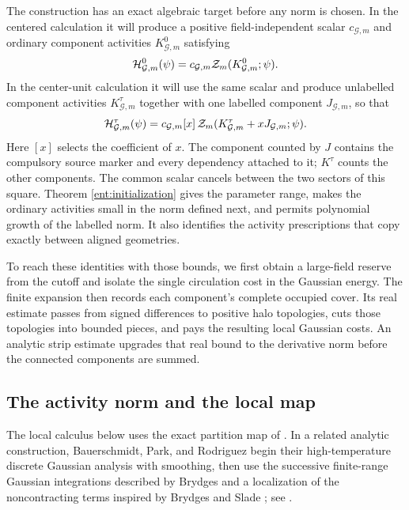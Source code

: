 The construction has an exact algebraic target before any norm is
chosen.  In the centered calculation it will produce a positive
field-independent scalar \(c_{\mathcal G,m}\) and ordinary component
activities \(K_{\mathcal G,m}^0\) satisfying
\begin{equation}\label{ent:ordinary-subset}
 \mathcal H_{\mathcal G,m}^0(\psi)
             =c_{\mathcal G,m}\mathcal Z_m(K_{\mathcal G,m}^0;\psi).
\end{equation}
In the center-unit calculation it will use the same scalar and produce
unlabelled component activities \(K_{\mathcal G,m}^\tau\) together
with one labelled component \(J_{\mathcal G,m}\), so that
\begin{equation}\label{ent:labelled-subset}
 \mathcal H_{\mathcal G,m}^\tau(\psi)
   =c_{\mathcal G,m}[x]\,
       \mathcal Z_m(K_{\mathcal G,m}^\tau+xJ_{\mathcal G,m};\psi).
\end{equation}
Here \([x]\) selects the coefficient of \(x\).  The component counted
by \(J\) contains the compulsory source marker and every dependency
attached to it; \(K^\tau\) counts the other components.  The common
scalar cancels between the two sectors of this square.  Theorem
\ref{ent:initialization} gives the parameter range, makes the ordinary
activities small in the norm defined next, and permits polynomial
growth of the labelled norm.  It also identifies the activity
prescriptions that copy exactly between aligned geometries.

To reach these identities with those bounds, we first obtain a
large-field reserve from the cutoff and isolate the single
circulation cost in the Gaussian energy.  The finite expansion then
records each component's complete occupied cover.  Its real estimate
passes from signed differences to positive halo topologies, cuts
those topologies into bounded pieces, and pays the resulting local
Gaussian costs.  An analytic strip estimate upgrades that real bound
to the derivative norm before the connected components are summed.

\subsection{The activity norm and the local map}

The local calculus below uses the exact partition map of
\cite[Proposition~4.8]{B}.  In a related analytic construction,
Bauerschmidt, Park, and Rodriguez begin their high-temperature discrete
Gaussian analysis with smoothing, then use the successive finite-range
Gaussian integrations described by Brydges \cite{Brydges2009} and a
localization of the noncontracting terms inspired by Brydges and Slade
\cite{BrydgesSlade2015}; see \cite[Section~1.5]{BPR2024I}.


